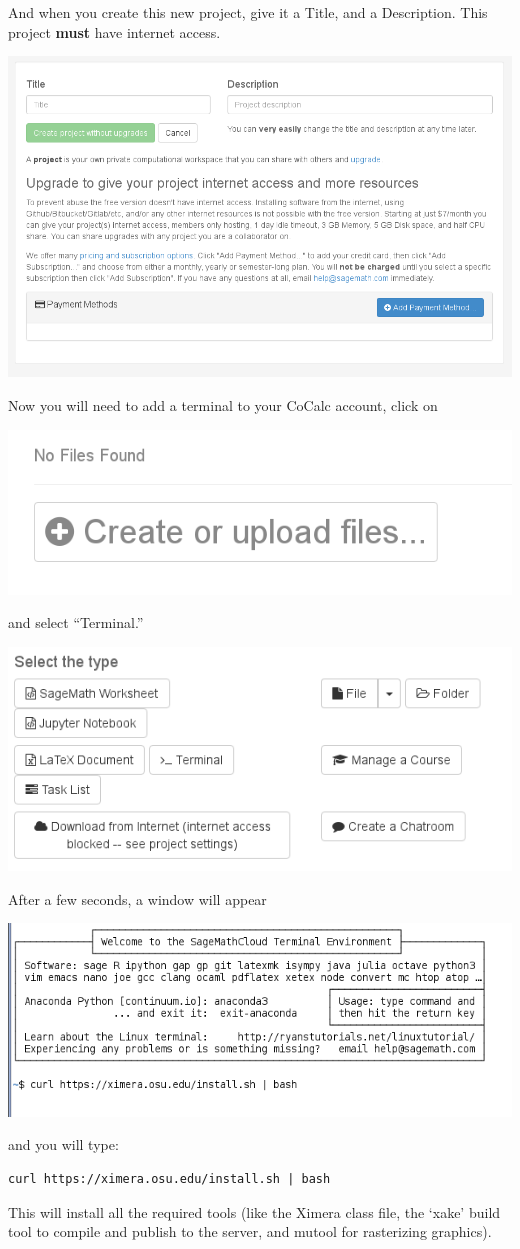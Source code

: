 \documentclass{ximera}
\begin{document}
And when you create this new project, give it a Title, and a
Description. This project \textbf{must} have internet access.
\begin{image}
  \includegraphics{internet.png}
\end{image}
Now you will need to add a terminal to your CoCalc account, click on
\begin{image}
  \includegraphics{create.png}
\end{image}
and select ``Terminal.'' 
\begin{image}
  \includegraphics{type.png}
\end{image}
After a few seconds, a window will appear
\begin{image}
  \includegraphics{typingCurl.png}
\end{image}
and you will type:
\begin{verbatim}
curl https://ximera.osu.edu/install.sh | bash
\end{verbatim}
This will install all the required tools (like the Ximera class file,
the `xake' build tool to compile and publish to the server, and mutool
for rasterizing graphics).
\end{document}
